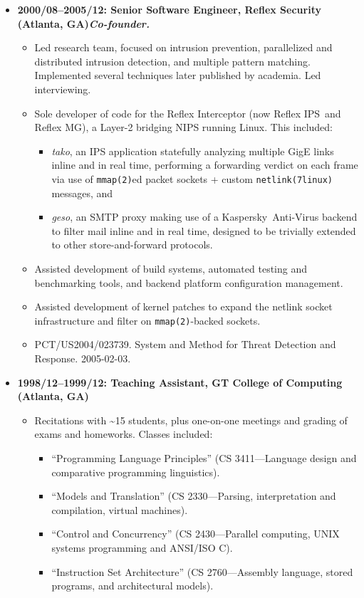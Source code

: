\documentclass{article}
\newenvironment{tightitemize}
{\begin{itemize}
  \setlength{\itemsep}{1pt}
  \setlength{\parskip}{0pt}
  \setlength{\parsep}{0pt}}
{\end{itemize}}
\begin{document}
\begin{tightitemize}
\item \textbf{2000/08--2005/12: Senior Software Engineer, Reflex Security (Atlanta, GA)\hfill \tiny{\textit{Co-founder.}}}
\begin{tightitemize}
\item Led research team, focused on intrusion prevention, parallelized and
  distributed intrusion detection, and multiple pattern matching. Implemented
  several techniques later published by academia. Led interviewing.
\item Sole developer of code for the Reflex Interceptor (now Reflex IPS\texttrademark\ and
  Reflex MG\texttrademark), a Layer-2 bridging NIPS running Linux. This included:
\begin{tightitemize}
    \item \textit{tako}, an IPS application statefully analyzing multiple GigE links inline
      and in real time, performing a forwarding verdict on each frame via use
      of \texttt{mmap(2)}ed packet sockets + custom \texttt{netlink(7linux)} messages, and
    \item \textit{geso}, an SMTP proxy making use of a Kaspersky\texttrademark\ Anti-Virus backend to
      filter mail inline and in real time, designed to be trivially extended
      to other store-and-forward protocols.
\end{tightitemize}
\item Assisted development of build systems, automated testing and benchmarking tools, and backend
      platform configuration management.
\item Assisted development of kernel patches to expand the netlink socket
      infrastructure and filter on \texttt{mmap(2)}-backed sockets.
\item PCT/US2004/023739. System and Method for Threat Detection and Response. 2005-02-03.\hfill {}\\
\end{tightitemize}

\item \textbf{1998/12--1999/12: Teaching Assistant, GT College of Computing (Atlanta, GA)}
\begin{tightitemize}
\item Recitations with \textasciitilde15 students, plus one-on-one meetings and grading of exams
and homeworks. Classes included:
\begin{tightitemize}
\item ``Programming Language Principles'' (CS 3411---Language design and comparative programming linguistics).
\item ``Models and Translation'' (CS 2330---Parsing, interpretation and compilation, virtual machines).
\item ``Control and Concurrency'' (CS 2430---Parallel computing, UNIX systems programming and ANSI/ISO C).
\item ``Instruction Set Architecture'' (CS 2760---Assembly language, stored programs, and architectural models).\\
\end{tightitemize}
\end{tightitemize}


\end{tightitemize}
\end{document}
